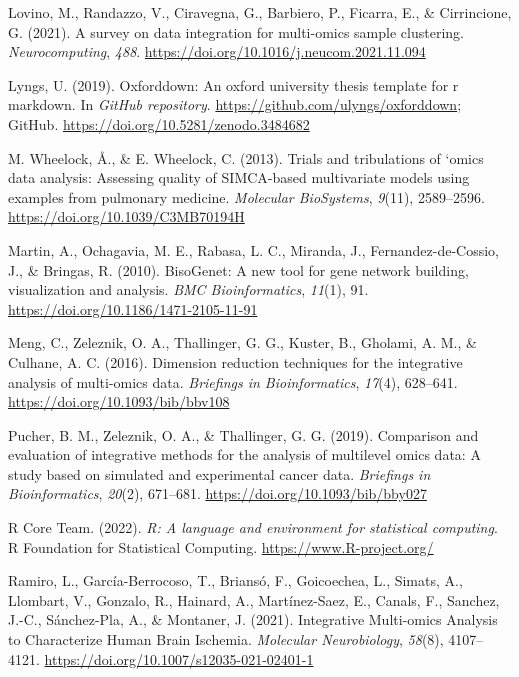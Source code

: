 \documentclass[a4paper, nobind]{templates/ociamthesis}
\newlength{\cslhangindent}
\newenvironment{CSLReferences}[2] %
 {%
  \setlength{\parindent}{0pt}
  \ifodd #1
  \let\oldpar\par
  \def\par{\hangindent=\cslhangindent\oldpar}
  \fi
  \setlength{\parskip}{1mm}
  \setlength{\baselineskip}{6mm}
 }%
 {}
\begin{document}
\begin{CSLReferences}{1}{0}
\leavevmode{}%
Lovino, M., Randazzo, V., Ciravegna, G., Barbiero, P., Ficarra, E., \& Cirrincione, G. (2021). A survey on data integration for multi-omics sample clustering. \emph{Neurocomputing}, \emph{488}. \url{https://doi.org/10.1016/j.neucom.2021.11.094}

\leavevmode{}%
Lyngs, U. (2019). Oxforddown: An oxford university thesis template for r markdown. In \emph{GitHub repository}. \url{https://github.com/ulyngs/oxforddown}; GitHub. \url{https://doi.org/10.5281/zenodo.3484682}

\leavevmode{}%
M. Wheelock, Å., \& E. Wheelock, C. (2013). Trials and tribulations of `omics data analysis: Assessing quality of {SIMCA}-based multivariate models using examples from pulmonary medicine. \emph{Molecular BioSystems}, \emph{9}(11), 2589--2596. \url{https://doi.org/10.1039/C3MB70194H}

\leavevmode{}%
Martin, A., Ochagavia, M. E., Rabasa, L. C., Miranda, J., Fernandez-de-Cossio, J., \& Bringas, R. (2010). {BisoGenet}: A new tool for gene network building, visualization and analysis. \emph{BMC Bioinformatics}, \emph{11}(1), 91. \url{https://doi.org/10.1186/1471-2105-11-91}

\leavevmode{}%
Meng, C., Zeleznik, O. A., Thallinger, G. G., Kuster, B., Gholami, A. M., \& Culhane, A. C. (2016). Dimension reduction techniques for the integrative analysis of multi-omics data. \emph{Briefings in Bioinformatics}, \emph{17}(4), 628--641. \url{https://doi.org/10.1093/bib/bbv108}

\leavevmode{}%
Pucher, B. M., Zeleznik, O. A., \& Thallinger, G. G. (2019). Comparison and evaluation of integrative methods for the analysis of multilevel omics data: A study based on simulated and experimental cancer data. \emph{Briefings in Bioinformatics}, \emph{20}(2), 671--681. \url{https://doi.org/10.1093/bib/bby027}

\leavevmode{}%
R Core Team. (2022). \emph{R: A language and environment for statistical computing}. R Foundation for Statistical Computing. \url{https://www.R-project.org/}

\leavevmode{}%
Ramiro, L., García-Berrocoso, T., Briansó, F., Goicoechea, L., Simats, A., Llombart, V., Gonzalo, R., Hainard, A., Martínez-Saez, E., Canals, F., Sanchez, J.-C., Sánchez-Pla, A., \& Montaner, J. (2021). Integrative {Multi}-omics {Analysis} to {Characterize} {Human} {Brain} {Ischemia}. \emph{Molecular Neurobiology}, \emph{58}(8), 4107--4121. \url{https://doi.org/10.1007/s12035-021-02401-1}


\end{CSLReferences}
\end{document}
